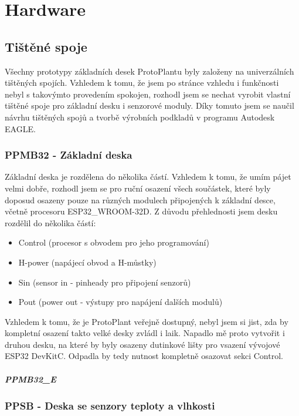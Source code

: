 \chapter{Hardware}

\section{Tištěné spoje}
Všechny prototypy základních desek ProtoPlantu byly založeny na univerzálních tištěných spojích. Vzhledem k tomu, že jsem po stránce vzhledu i funkčnosti nebyl s takovýmto provedením spokojen, rozhodl jsem se nechat vyrobit vlastní tištěné spoje pro základní desku i senzorové moduly.
Díky tomuto jsem se naučil návrhu tištěných spojů a tvorbě výrobních podkladů v programu Autodesk EAGLE.

\subsection{PPMB32 - Základní deska}
Základní deska je rozdělena do několika částí. Vzhledem k tomu, že umím pájet velmi dobře, rozhodl jsem se pro ruční osazení všech součástek, které byly doposud osazeny pouze na různých modulech připojených k základní desce, včetně procesoru ESP32_WROOM-32D.
Z důvodu přehlednosti jsem desku rozdělil do několika částí:
\begin{itemize}
    \item Control (procesor s obvodem pro jeho programování)
    \item H-power (napájecí obvod a H-můstky)
    \item Sin (sensor in - pinheady pro připojení senzorů)
    \item Pout (power out - výstupy pro napájení dalších modulů)
\end{itemize} 

Vzhledem k tomu, že je ProtoPlant veřejně dostupný, nebyl jsem si jist, zda by kompletní osazení takto velké desky zvládl i laik. Napadlo mě proto vytvořit i druhou desku, na které by byly osazeny dutinkové lišty pro vsazení vývojové ESP32 DevKitC. Odpadla by tedy nutnost kompletně osazovat sekci Control. 

\paragraph{PPMB32_E}


\subsection{PPSB - Deska se senzory teploty a vlhkosti}

